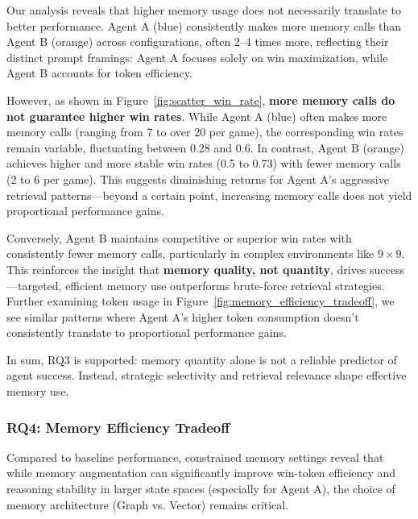 \documentclass[10pt]{article}
\begin{document}
Our analysis reveals that higher memory usage does not necessarily translate to better performance. Agent A (blue) consistently makes more memory calls than Agent B (orange) across configurations, often 2–4 times more, reflecting their distinct prompt framings: Agent A focuses solely on win maximization, while Agent B accounts for token efficiency.

However, as shown in Figure~\ref{fig:scatter_win_rate}, \textbf{more memory calls do not guarantee higher win rates}. While Agent A (blue) often makes more memory calls (ranging from 7 to over 20 per game), the corresponding win rates remain variable, fluctuating between 0.28 and 0.6. In contrast, Agent B (orange) achieves higher and more stable win rates (0.5 to 0.73) with fewer memory calls (2 to 6 per game). This suggests diminishing returns for Agent A's aggressive retrieval patterns—beyond a certain point, increasing memory calls does not yield proportional performance gains.

Conversely, Agent B maintains competitive or superior win rates with consistently fewer memory calls, particularly in complex environments like $9\times9$. This reinforces the insight that \textbf{memory quality, not quantity}, drives success—targeted, efficient memory use outperforms brute-force retrieval strategies. Further examining token usage in Figure~\ref{fig:memory_efficiency_tradeoff}, we see similar patterns where Agent A's higher token consumption doesn't consistently translate to proportional performance gains.

In sum, RQ3 is supported: memory quantity alone is not a reliable predictor of agent success. Instead, strategic selectivity and retrieval relevance shape effective memory use.

\subsubsection{RQ4: Memory Efficiency Tradeoff}

Compared to baseline performance, constrained memory settings reveal that while memory augmentation can significantly improve win-token efficiency and reasoning stability in larger state spaces (especially for Agent A), the choice of memory architecture (Graph vs. Vector) remains critical.
\end{document}
